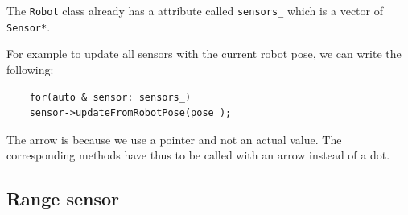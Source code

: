 \documentclass{ecnreport}
\begin{document}
The \texttt{Robot} class already has a attribute called \texttt{sensors\_} which is a vector of \texttt{Sensor*}.

For example to update all sensors with the current robot pose, we can write the following:
\begin{center}\cppstyle
\begin{lstlisting}
    for(auto & sensor: sensors_)
	sensor->updateFromRobotPose(pose_);
\end{lstlisting}
\end{center}The arrow is because we use a pointer and not an actual value. The corresponding methods have thus to be 
called with an arrow instead of a dot.





\subsection{Range sensor}
\end{document}
